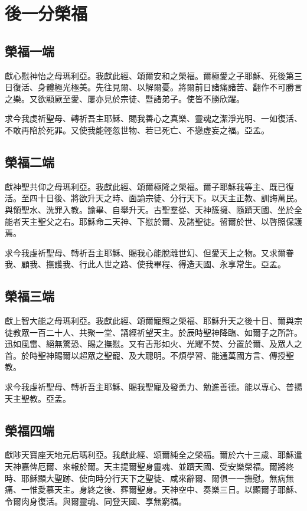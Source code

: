 \section*{後一分榮福}
\subsection{榮福一端}
獻{\cspace}心慰神怡之母瑪利亞。我獻此經、頌爾安和之榮福。爾極愛之子耶穌、死後第三日復活、身體極光極美。先往見爾、以解爾憂。將爾前日諸痛諸苦、翻作不可勝言之樂。又欲顯厥至愛、屢亦見於宗徒、暨諸弟子。使皆不勝欣躍。

求{\cspace}今我虔祈聖母、轉祈吾主耶穌、賜我善心之真樂、靈魂之潔淨光明、一如復活、不敢再陷於死罪。又使我能輕忽世物、若已死亡、不戀虛妄之福。{\cspace}亞孟。

\subsection{榮福二端}
獻{\cspace}神聖共仰之母瑪利亞。我獻此經、頌爾極隆之榮福。爾子耶穌我等主、既已復活。至四十日後、將欲升天之時、面諭宗徒、分行天下。以天主正教、訓誨萬民。與領聖水、洗罪入教。諭畢、自舉升天。古聖羣從、天神簇擁、隨躋天國、坐於全能者天主聖父之右。耶穌命二天神、下慰於爾、及諸聖徒。留爾於世、以啓照保護焉。

求{\cspace}今我虔祈聖母、轉祈吾主耶穌、賜我心能脫離世幻、但愛天上之物。又求爾眷我、顧我、撫護我、行此人世之路、使我畢程、得造天國、永享常生。{\cspace}亞孟。

\subsection{榮福三端}
獻{\cspace}上智大能之母瑪利亞。我獻此經、頌爾寵照之榮福、耶穌升天之後十日、爾與宗徒教眾一百二十人、共聚一堂、誦經祈望天主。於辰時聖神降臨、如爾子之所許。迅如風雷、絕無驚恐、賜之撫慰。又有舌形如火、光耀不焚、分置於爾、及眾人之首。於時聖神賜爾以超眾之聖寵、及大聰明。不煩學習、能通萬國方言、傳授聖教。

求{\cspace}今我虔祈聖母、轉祈吾主耶穌、賜我聖寵及發勇力、勉進善德。能以專心、普揚天主聖教。{\cspace}亞孟。

\subsection{榮福四端}
獻{\cspace}陟天寶座天地元后瑪利亞。我獻此經、頌爾純全之榮福。爾於六十三歲、耶穌遣天神嘉俾厄爾、來報於爾。天主提爾聖身靈魂、並躋天國、受安樂榮福。爾將終時、耶穌顯大聖跡、使向時分行天下之聖徒、咸來辭爾、爾俱一一撫慰。無病無痛、一惟愛慕天主。身終之後、葬爾聖身。天神空中、奏樂三日。以顯爾子耶穌、令爾肉身復活。與爾靈魂、同登天國、享無窮福。

